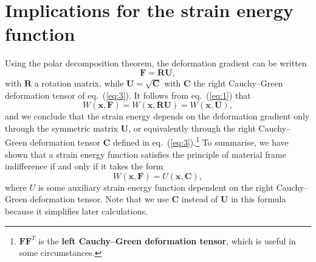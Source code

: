 \section*{Implications for the strain energy function}

Using the polar decomposition theorem, the deformation gradient can be written
\begin{equation}
\mathbf{F} = \mathbf{R}\mathbf{U},
\label{eq:6}
\end{equation}
with $\mathbf{R}$ a rotation matrix, while $\mathbf{U} = \sqrt{\mathbf{C}}$ with $\mathbf{C}$ the right Cauchy--Green deformation tensor of eq.~(\ref{eq:3}). It follows from eq.~(\ref{eq:1}) that
\begin{equation}
W(\mathbf{x}, \mathbf{F}) = W(\mathbf{x}, \mathbf{R}\mathbf{U}) = W(\mathbf{x}, \mathbf{U}),
\label{eq:7}
\end{equation}
and we conclude that the strain energy depends on the deformation gradient only through the symmetric matrix $\mathbf{U}$,
 or equivalently through the right Cauchy--Green deformation tensor $\mathbf{C}$ defined in eq.~(\ref{eq:3}).\footnote{$\mathbf{F}\mathbf{F}^T$ is the
 \textbf{left Cauchy--Green deformation tensor}, which is useful in some circumstances.} To summarise, we have shown 
 that a strain energy function satisfies the principle of material frame indifference if and only if it takes the form
\begin{equation}
W(\mathbf{x}, \mathbf{F}) = U(\mathbf{x}, \mathbf{C}),
\label{eq:9}
\end{equation}
where $U$ is some auxiliary strain energy function dependent on the right Cauchy--Green deformation tensor. Note that we use $\mathbf{C}$ instead of $\mathbf{U}$ in this formula because it simplifies later calculations.

